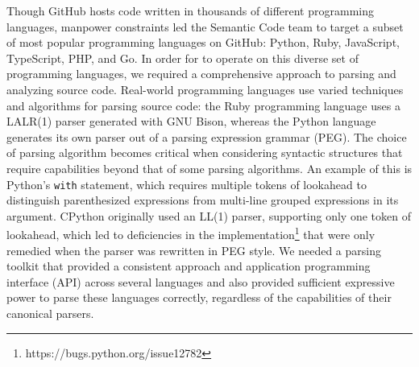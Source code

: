 \documentclass[acmsmall,fleqn]{acmart}
\begin{document}
Though GitHub hosts code written in thousands of different programming
languages, manpower constraints led the Semantic Code team to target a subset of
most popular programming languages on GitHub: Python, Ruby, JavaScript,
TypeScript, PHP, and Go. In order for \semantic{} to operate on this diverse set
of programming languages, we required a comprehensive approach to parsing and
analyzing source code. Real-world programming languages use varied techniques
and algorithms for parsing source code: the Ruby programming language uses a
LALR(1) parser generated with GNU Bison, whereas the Python language generates
its own parser out of a parsing expression grammar (PEG). The choice of parsing
algorithm becomes critical when considering syntactic structures that require
capabilities beyond that of some parsing algorithms. An example of this is
Python’s \texttt{with} statement, which requires multiple tokens of lookahead to
distinguish parenthesized expressions from multi-line grouped expressions in its
argument. CPython originally used an LL(1) parser, supporting only one token of
lookahead, which led to deficiencies in the
implementation\footnote{https://bugs.python.org/issue12782} that were only
remedied when the parser was rewritten in PEG style. We needed a parsing toolkit
that provided a consistent approach and application programming interface (API)
across several languages and also provided sufficient expressive power to parse
these languages correctly, regardless of the capabilities of their canonical
parsers.
\end{document}
